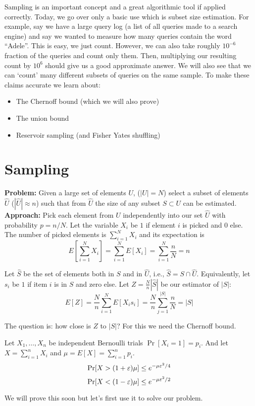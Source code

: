 \documentclass{article}
\begin{document}

Sampling is an important concept and a great algorithmic tool if applied correctly.
Today, we go over only a basic use which is subset size estimation.
For example, say we have a large query log (a list of all queries made to a search engine)
and say we wanted to measure how many queries contain the word ``Adele''.
This is easy, we just count. 
However, we can also take roughly $10^{-6}$ fraction of the queries and count only them.
Then, multiplying our resulting count by $10^{6}$ should give us a good approximate answer.
We will also see that we can `count' many different subsets of queries on the same sample.
To make these claims accurate we learn about:
\begin{itemize}
\item The Chernoff bound (which we will also prove)
\item The union bound 
\item Reservoir sampling (and Fisher Yates shuffling)
\end{itemize}



\section{Sampling}

{\bf Problem:} Given a large set of elements $U$, ($|U|=N$) select a subset of elements 
$\hat{U}$ ($|\hat{U}| \approx n$) such that from 
$\hat{U}$ the size of any subset $S \subset U$ can be estimated.\\
{\bf Approach:} Pick each element from $U$ independently into our set $\hat{U}$ with probability $p = n/N$.
Let the variable $X_i$ be $1$ if element $i$ is picked and $0$ else.
The number of picked elements is $\sum_{i=1}^{N} X_i$ and its expectation is 
$$E[\sum_{i=1}^{N} X_i] = \sum_{i=1}^{N}E[X_i] = \sum_{i=1}^{N}\frac{n}{N} = n$$

Let $\hat{S}$ be the set of elements both in $S$ and in $\hat{U}$, i.e., $\hat{S} =  S \cap \hat{U}$. 
Equivalently, let $s_i$ be $1$ if item $i$ is in $S$ and zero else. 
Let $Z = \frac{N}{n}|\hat{S}|$ be our estimator of $|S|$:
\[
E[Z] = \frac{N}{n}\sum_{i=1}^{N}E[X_i s_i] = \frac{N}{n}\sum_{j=1}^{|S|} \frac{n}{N} =  |S|
\]

\noindent The question is: how close is $Z$ to $|S|$? For this we need the Chernoff bound.

\begin{lemma}
Let $X_1,\ldots,X_n$ be independent Bernoulli trials $\Pr[X_i=1] = p_i$. 
And let $X = \sum_{i=1}^{n}X_i$ and $\mu = E[X] = \sum_{i=1}^{n}p_i$.
\begin{equation}
\Pr[X > (1 + \varepsilon)\mu] \le e^{-\mu \varepsilon^2/4}
\end{equation} 
\begin{equation}
\Pr[X < (1 - \varepsilon)\mu] \le e^{-\mu \varepsilon^2/2}
\end{equation} 
\end{lemma}
We will prove this soon but let's first use it to solve our problem.
\end{document}

